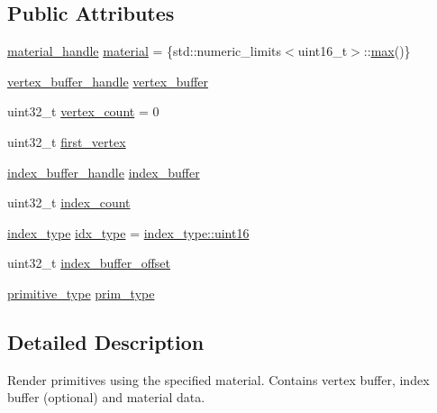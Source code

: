 \subsection*{Public Attributes}
\begin{DoxyCompactItemize}
\item 
\mbox{\hyperlink{structmoka_1_1material__handle}{material\+\_\+handle}} \mbox{\hyperlink{classmoka_1_1draw__command_aa05522862c600afcd40a29dbe2df6d3d}{material}} = \{std\+::numeric\+\_\+limits$<$uint16\+\_\+t$>$\+::\mbox{\hyperlink{namespacemoka_acf03408f89c521244763fb5f8746ce16a2ffe4e77325d9a7152f7086ea7aa5114}{max}}()\}
\item 
\mbox{\hyperlink{structmoka_1_1vertex__buffer__handle}{vertex\+\_\+buffer\+\_\+handle}} \mbox{\hyperlink{classmoka_1_1draw__command_aa16638c2fa411a81474d75e1e385be54}{vertex\+\_\+buffer}}
\item 
uint32\+\_\+t \mbox{\hyperlink{classmoka_1_1draw__command_a6a2c0c076a81ca8b7f81b3f40a471728}{vertex\+\_\+count}} = 0
\item 
uint32\+\_\+t \mbox{\hyperlink{classmoka_1_1draw__command_a9e5374f3b03168ea8dd28a3d6a08d41a}{first\+\_\+vertex}}
\item 
\mbox{\hyperlink{structmoka_1_1index__buffer__handle}{index\+\_\+buffer\+\_\+handle}} \mbox{\hyperlink{classmoka_1_1draw__command_ab05fb02edc9e31e20ecb875ad2a496e4}{index\+\_\+buffer}}
\item 
uint32\+\_\+t \mbox{\hyperlink{classmoka_1_1draw__command_a7ba09ac32bed07dd45d4a49284a72063}{index\+\_\+count}}
\item 
\mbox{\hyperlink{namespacemoka_a32244b0de63481283738e2db11639e3f}{index\+\_\+type}} \mbox{\hyperlink{classmoka_1_1draw__command_a39fa2598343c32a5894fd8e3ed79c21f}{idx\+\_\+type}} = \mbox{\hyperlink{namespacemoka_a32244b0de63481283738e2db11639e3faa00ef2ef85ff67b7b39339886f19044f}{index\+\_\+type\+::uint16}}
\item 
uint32\+\_\+t \mbox{\hyperlink{classmoka_1_1draw__command_a2e56901ae7ccbbce13789e147606e399}{index\+\_\+buffer\+\_\+offset}}
\item 
\mbox{\hyperlink{namespacemoka_a345d155429e260a6344f9c555f04ae9c}{primitive\+\_\+type}} \mbox{\hyperlink{classmoka_1_1draw__command_a360338ff71fd349287e88e96bf315e33}{prim\+\_\+type}}
\end{DoxyCompactItemize}


\subsection{Detailed Description}
Render primitives using the specified material. Contains vertex buffer, index buffer (optional) and material data. 

